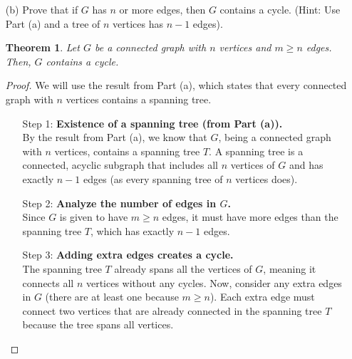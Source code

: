\documentclass[12pt]{article}
\theoremstyle{plain}
\newtheorem*{theorem}{Theorem}
\begin{document}
\begin{itemize}
\begin{proof}
\begin{itemize}
\begin{itemize}
\begin{itemize}
            \end{itemize}
            \item[3.] \textbf{Reconnect the removed vertex: }
            \begin{itemize}
                \item Now, add back the vertex \( v \) and one of its edges to any vertex in the spanning tree \( T' \). Since \( G \) is connected, such an edge must exist.
                \item By adding this edge, we ensure that the vertex \( v \) is now connected to the spanning tree \( T' \), and since we only added one edge, the resulting graph remains acyclic.
            \end{itemize}
        \end{itemize}
        Thus, the graph \( G \) with \( n = k+1 \) vertices contains a spanning tree.
        \item[] \textbf{Conclusion:} By induction, we have shown that every connected graph with \( n \) vertices contains a spanning tree. 
    \end{itemize}
    \end{proof}
    \newpage
    \item[(b)] Prove that if $G$ has $n$ or more edges, then $G$ contains a cycle. (Hint: Use Part (a) and a tree of $n$ vertices has $n-1$ edges). 
    \begin{theorem}
        Let \( G \) be a connected graph with \( n \) vertices and \( m \geq n \) edges. Then, \( G \) contains a cycle.
    \end{theorem}
    \begin{proof} We will use the result from Part (a), which states that every connected graph with \( n \) vertices contains a spanning tree.
    \begin{itemize}
        \item[Step 1:] \textbf{Existence of a spanning tree (from Part (a)).} \\
        By the result from Part (a), we know that \( G \), being a connected graph with \( n \) vertices, contains a spanning tree \( T \). A spanning tree is a connected, acyclic subgraph that includes all \( n \) vertices of \( G \) and has exactly \( n-1 \) edges (as every spanning tree of \( n \) vertices does).
        \item[Step 2:] \textbf{Analyze the number of edges in \( G \).} \\
        Since \( G \) is given to have \( m \geq n \) edges, it must have more edges than the spanning tree \( T \), which has exactly \( n-1 \) edges.
        \item[Step 3:] \textbf{Adding extra edges creates a cycle.} \\
        The spanning tree \( T \) already spans all the vertices of \( G \), meaning it connects all \( n \) vertices without any cycles. 
        Now, consider any extra edges in \( G \) (there are at least one because \( m \geq n \)). Each extra edge must connect two vertices that are already connected in the spanning tree \( T \) because the tree spans all vertices. \\
        

\end{itemize}
\end{proof}
\end{itemize}
\end{document}
